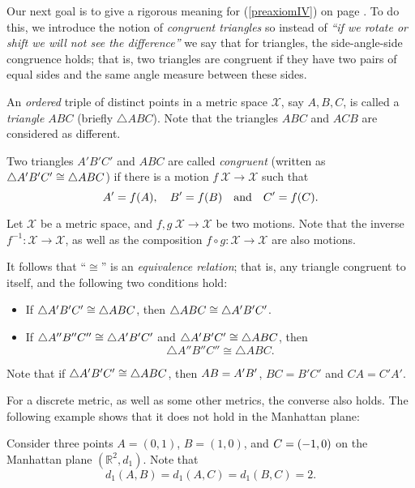 Our next goal is to give a rigorous meaning for (\ref{preaxiomIV}) on page \pageref{preaxiomIV}.
To do this, we introduce the notion of {}\emph{congruent triangles}
so instead of {}\emph{``if we rotate or shift we will not see the difference''} we say that for triangles, the side-angle-side congruence holds;
that is, two triangles are congruent if they have two pairs of equal sides and the same angle measure between these sides.

An {}\emph{ordered} triple of distinct points in a metric space $\mathcal{X}$, 
say $A,B,C$,
is called a \emph{triangle $ABC$}\label{page:def:triangle} (briefly $\triangle A B C$).
Note that the triangles $A B C$ and $A C B$ are considered as different.

Two triangles $A' B' C'$ and $A B C$ are called 
\emph{congruent}
(written as $\triangle A' B' C'\z\cong\triangle A B C$) if there is a motion $f\:\mathcal{X}\to\mathcal{X}$ such that 
\[A'\z=f(A),
\quad
B'=f(B)
\quad
\text{and}
\quad
C'=f(C).\]

Let $\mathcal X$ be a metric space,
and $f,g\:\mathcal X\to\mathcal X$ be two motions.
Note that the inverse $f^{-1}:\mathcal X\to\mathcal X$,
as well as the composition $f\circ g:\mathcal X\to\mathcal X$
are also motions.

It follows that ``$\cong$'' is an \emph{equivalence relation};
that is, any triangle congruent to itself, 
and the following two conditions hold:
\begin{itemize} 
\item If $\triangle A' B' C'\z\cong\triangle A B C$, then $\triangle A B C\z\cong\triangle A' B' C'$.
\item If $\triangle A'' B'' C''\z\cong\triangle A' B' C'$ and $\triangle A' B' C'\z\cong\triangle A B C$,
then 
$$\triangle A'' B'' C''\cong\triangle A B C.$$
\end{itemize}


Note that if $\triangle A' B' C'\z\cong\triangle A B C$,
then $AB\z=A'B'$,
$BC=B'C'$ and $CA=C'A'$.

For a discrete metric, as well as some other metrics, 
the converse also holds.
The following example shows that it does not hold in the Manhattan plane:

\label{example:isometric but not congruent} Consider three points 
$A=(0,1)$, $B=(1,0)$, and $C\z=(-1,0)$ on the Manhattan plane $(\mathbb{R}^2,d_1)$.
Note that
$$d_1(A,B)=d_1(A,C)=d_1(B,C)=2.$$

